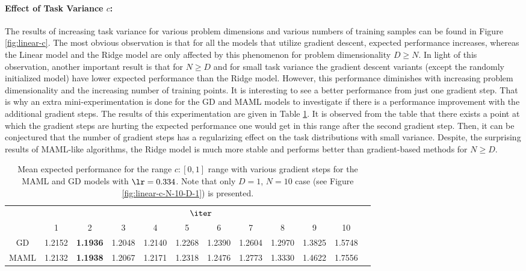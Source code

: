 \paragraph{Effect of Task Variance $c$:} The results of increasing task variance for various problem dimensions and various numbers of training samples can be found in Figure \ref{fig:linear-c}. The most obvious observation is that for all the models that utilize gradient descent, expected performance increases, whereas the Linear model and the Ridge model are only affected by this phenomenon for problem dimensionality $D\geq N$. In light of this observation, another important result is that for $N\geq D$ and for small task variance the gradient descent variants (except the randomly initialized model) have lower expected performance than the Ridge model. However, this performance diminishes with increasing problem dimensionality and the increasing number of training points. It is interesting to see a better performance from just one gradient step. That is why an extra mini-experimentation is done for the GD and MAML models to investigate if there is a performance improvement with the additional gradient steps. The results of this experimentation are given in Table \ref{tab:zoom}. It is observed from the table that there exists a point at which the gradient steps are hurting the expected performance one would get in this range after the second gradient step. Then, it can be conjectured that the number of gradient steps has a regularizing effect on the task distributions with small variance. Despite, the surprising results of MAML-like algorithms, the Ridge model is much more stable and performs better than gradient-based methods for $N\geq D$.

\begin{table}
  \centering
  \caption{Mean expected performance for the range $c:[0,1]$ range with various gradient steps for the MAML and GD models with $\lr=0.334$. Note that only $D=1$, $N=10$ case (see Figure \ref{fig:linear-c-N-10-D-1}) is presented.}\label{tab:zoom}
  \begin{tabular}{c|c|c|c|c|c|c|c|c|c|c|c|}
    \cline{2-11}
     & \multicolumn{10}{|c|}{$\iter$}\\
    \cline{2-11}
     & 1 & 2 & 3 & 4 & 5 & 6 & 7 & 8 & 9 & 10\\
    \hline
    \multicolumn{1}{|c|}{GD} & 1.2152 &  \textbf{1.1936} & 1.2048 & 1.2140 &  1.2268 & 1.2390 & 1.2604 & 1.2970 &1.3825 & 1.5748\\
    \hline
    \multicolumn{1}{|c|}{MAML} & 1.2132 & \textbf{1.1938} & 1.2067 & 1.2171 & 1.2318 & 1.2476 & 1.2773 & 1.3330 & 1.4622 & 1.7556  \\
    \hline
    \end{tabular}
\end{table}

